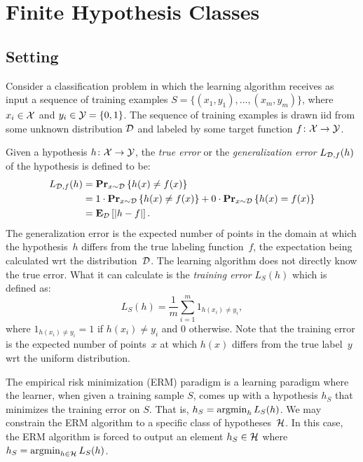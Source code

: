 \chapter{Finite Hypothesis Classes}

\section{Setting}

Consider a classification problem in which the learning algorithm receives as input
a sequence of training examples $S = \{(x_1, y_1), \ldots, (x_m, y_m)\}$,
where $x_i \in \mathcal{X}$ and $y_i \in \mathcal{Y} = \{0, 1\}$. The sequence of training
examples is drawn iid from some unknown distribution $\mathcal{D}$ and labeled by some
target function $f \colon \mathcal{X} \rightarrow \mathcal{Y}$.

Given a hypothesis $h \colon \mathcal{X} \rightarrow \mathcal{Y}$, the \emph{true error}
or the \emph{generalization error} $L_{\mathcal{D}, f}(h)$ of the hypothesis is defined to be:
\begin{align*}
    L_{\mathcal{D}, f}(h) & = \mathbf{Pr}_{x \sim \mathcal{D}} \left \{ h(x) \neq f(x) \right \} \\
                 & = 1 \cdot \mathbf{Pr}_{x \sim \mathcal{D}} \left \{ h(x) \neq f(x) \right \} +
                     0 \cdot \mathbf{Pr}_{x \sim \mathcal{D}} \left \{ h(x) = f(x) \right \} \\
                 & = \mathbf{E}_{\mathcal{D}} \left [ \lvert h - f \rvert \right ].
\end{align*}
The generalization error is the expected number of points in the domain at which
the hypothesis~$h$ differs from the true labeling function~$f$, the expectation being
calculated wrt the distribution~$\mathcal{D}$. The learning
algorithm does not directly know the true error. What it can calculate
is the \emph{training error} $L_{S}(h)$ which is defined as:
\[
    L_S (h) = \frac{1}{m} \sum_{i = 1}^{m} 1_{h(x_i) \neq y_i},
\]
where $1_{h(x_i) \neq y_i} =  1$ if $h(x_i) \neq y_i$ and $0$ otherwise. Note that
the training error is the expected number of points~$x$ at which $h(x)$ differs from
the true label~$y$ wrt the uniform distribution.

The empirical risk minimization (ERM) paradigm is a learning paradigm where the learner,
when given a training sample $S$, comes up with a hypothesis $h_S$ that minimizes
the training error on $S$. That is, $h_S = \operatorname{argmin}_{h} L_S(h)$. We may
constrain the ERM algorithm to a specific class of hypotheses~$\mathcal{H}$. In this
case, the ERM algorithm is forced to output an element $h_S \in \mathcal{H}$ where
$h_S = \operatorname{argmin}_{h \in \mathcal{H}} L_S(h)$.


